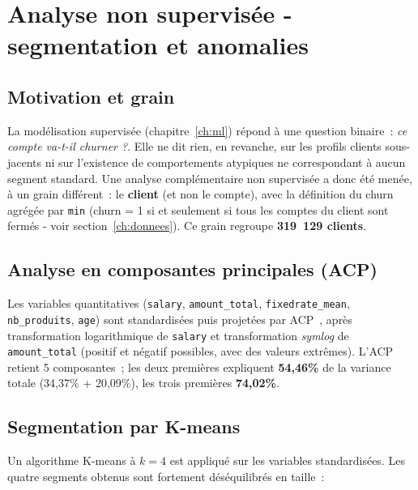 \documentclass[11pt,a4paper]{report}
\begin{document}
\chapter{Analyse non supervis\'ee - segmentation et anomalies}
\label{ch:datamining}

\section{Motivation et grain}

La mod\'elisation supervis\'ee (chapitre~\ref{ch:ml}) r\'epond \`a une question
binaire~: \emph{ce compte va-t-il churner ?}. Elle ne dit rien, en revanche,
sur les profils clients sous-jacents ni sur l'existence de comportements
atypiques ne correspondant \`a aucun segment standard. Une analyse
compl\'ementaire non supervis\'ee a donc \'et\'e men\'ee, \`a un grain diff\'erent~:
le \textbf{client} (et non le compte), avec la d\'efinition du churn agr\'eg\'ee
par \texttt{min} (churn = 1 si et seulement si tous les comptes du client sont
ferm\'es - voir section~\ref{ch:donnees}). Ce grain regroupe
\textbf{319~129 clients}.

\section{Analyse en composantes principales (ACP)}

Les variables quantitatives (\texttt{salary}, \texttt{amount\_total},
\texttt{fixedrate\_mean}, \texttt{nb\_produits}, \texttt{age}) sont
standardis\'ees puis projet\'ees par ACP~\citep{jolliffe2002pca}, apr\`es
transformation logarithmique de \texttt{salary} et transformation
\emph{symlog} de \texttt{amount\_total} (positif et n\'egatif possibles, avec
des valeurs extr\^emes). L'ACP retient 5 composantes~; les deux premi\`eres
expliquent \textbf{54,46\%} de la variance totale (34,37\% + 20,09\%), les
trois premi\`eres \textbf{74,02\%}.

\section{Segmentation par K-means}

Un algorithme K-means \`a $k=4$ est appliqu\'e sur les variables standardis\'ees.
Les quatre segments obtenus sont fortement d\'es\'equilibr\'es en taille~:
\end{document}
